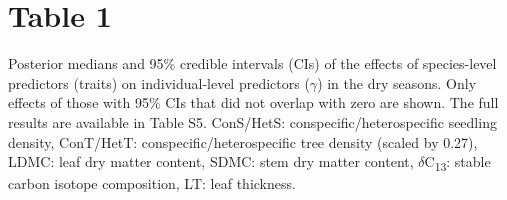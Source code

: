 \documentclass[
  12pt,
  letterpaper,
  DIV=11,
  numbers=noendperiod]{scrartcl}
\author{}
\date{}
\begin{document}
\ifdefined\Shaded\renewenvironment{Shaded}{\begin{tcolorbox}[sharp corners, boxrule=0pt, frame hidden, interior hidden, breakable, enhanced, borderline west={3pt}{0pt}{shadecolor}]}{\end{tcolorbox}}\fi

\hypertarget{table-1}{%
\section{Table 1}\label{table-1}}

Posterior medians and 95\% credible intervals (CIs) of the effects of
species-level predictors (traits) on individual-level predictors
(\(\gamma\)) in the dry seasons. Only effects of those with 95\% CIs
that did not overlap with zero are shown. The full results are available
in Table S5. ConS/HetS: conspecific/heterospecific seedling density,
ConT/HetT: conspecific/heterospecific tree density (scaled by 0.27),
LDMC: leaf dry matter content, SDMC: stem dry matter content,
\(\delta\)C\textsubscript{13}: stable carbon isotope composition, LT:
leaf thickness.
\end{document}
